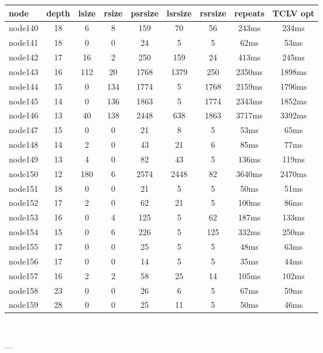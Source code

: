 \begin{tabular}{|l|c|c|c|c|c|c|c|c|}
\hline node & depth & lsize & rsize & psrsize & lsrsize & rsrsize   & repeats & TCLV opt\\
    \hline node140 & 18 & 6 & 8 & 159 & 70 & 56 & 243ms & 234ms\\
    \hline node141 & 18 & 0 & 0 & 24 & 5 & 5 & 62ms & 53ms\\
    \hline node142 & 17 & 16 & 2 & 250 & 159 & 24 & 413ms & 245ms\\
    \hline node143 & 16 & 112 & 20 & 1768 & 1379 & 250 & 2350ms & 1898ms\\
    \hline node144 & 15 & 0 & 134 & 1774 & 5 & 1768 & 2159ms & 1796ms\\
    \hline node145 & 14 & 0 & 136 & 1863 & 5 & 1774 & 2343ms & 1852ms\\
    \hline node146 & 13 & 40 & 138 & 2448 & 638 & 1863 & 3717ms & 3392ms\\
    \hline node147 & 15 & 0 & 0 & 21 & 8 & 5 & 53ms & 65ms\\
    \hline node148 & 14 & 2 & 0 & 43 & 21 & 6 & 85ms & 77ms\\
    \hline node149 & 13 & 4 & 0 & 82 & 43 & 5 & 136ms & 119ms\\
    \hline node150 & 12 & 180 & 6 & 2574 & 2448 & 82 & 3640ms & 2470ms\\
    \hline node151 & 18 & 0 & 0 & 21 & 5 & 5 & 50ms & 51ms\\
    \hline node152 & 17 & 2 & 0 & 62 & 21 & 5 & 100ms & 86ms\\
    \hline node153 & 16 & 0 & 4 & 125 & 5 & 62 & 187ms & 133ms\\
    \hline node154 & 15 & 0 & 6 & 226 & 5 & 125 & 332ms & 250ms\\
    \hline node155 & 17 & 0 & 0 & 25 & 5 & 5 & 48ms & 63ms\\
    \hline node156 & 17 & 0 & 0 & 14 & 5 & 5 & 35ms & 44ms\\
    \hline node157 & 16 & 2 & 2 & 58 & 25 & 14 & 105ms & 102ms\\
    \hline node158 & 23 & 0 & 0 & 26 & 6 & 5 & 67ms & 59ms\\
    \hline node159 & 28 & 0 & 0 & 25 & 11 & 5 & 50ms & 46ms\\

\hline
\end{tabular} \

---


